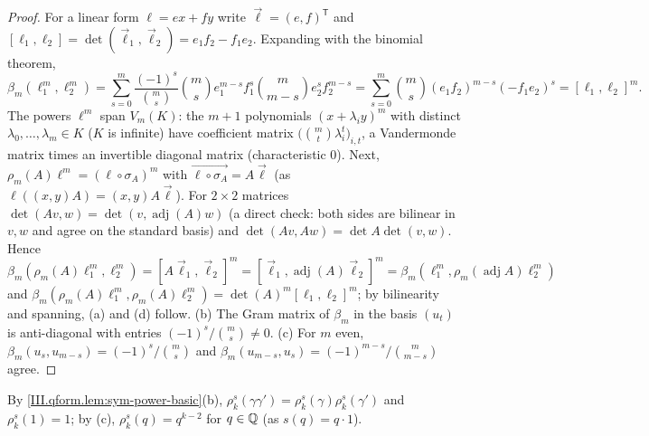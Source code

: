 \begin{lemma}
\end{lemma}
\begin{proof}
For a linear form $\ell=ex+fy$ write $\vec\ell=(e,f)^{\mathsf T}$ and $[\ell_1,\ell_2]=\det(\vec\ell_1,\vec\ell_2)=e_1f_2-f_1e_2$. Expanding with the
binomial theorem,
\[
  \beta_m(\ell_1^m,\ell_2^m)=\sum_{s=0}^m\frac{(-1)^s}{\binom ms}\binom ms e_1^{m-s}f_1^s\binom m{m-s}e_2^{s}f_2^{m-s}
  =\sum_{s=0}^m\binom ms(e_1f_2)^{m-s}(-f_1e_2)^s=[\ell_1,\ell_2]^m.
\]
The powers $\ell^m$ span $V_m(K)$: the $m+1$ polynomials $(x+\lambda_iy)^m$ with distinct $\lambda_0,\dots,\lambda_m\in K$ ($K$ is infinite) have
coefficient matrix $\bigl(\binom mt\lambda_i^t\bigr)_{i,t}$, a Vandermonde matrix times an invertible diagonal matrix (characteristic $0$). Next,
$\rho_m(A)\ell^m=(\ell\circ\sigma_A)^m$ with $\overrightarrow{\ell\circ\sigma_A}=A\vec\ell$ (as $\ell((x,y)A)=(x,y)A\vec\ell$). For $2\times2$ matrices
$\det(Av,w)=\det(v,\operatorname{adj}(A)w)$ (a direct check: both sides are bilinear in $v,w$ and agree on the standard basis) and
$\det(Av,Aw)=\det A\det(v,w)$. Hence
$\beta_m(\rho_m(A)\ell_1^m,\ell_2^m)=[A\vec\ell_1,\vec\ell_2]^m=[\vec\ell_1,\operatorname{adj}(A)\vec\ell_2]^m=\beta_m(\ell_1^m,\rho_m(\operatorname{adj}A)\ell_2^m)$ and
$\beta_m(\rho_m(A)\ell_1^m,\rho_m(A)\ell_2^m)=\det(A)^m[\ell_1,\ell_2]^m$; by bilinearity and spanning, (a) and (d) follow. (b) The Gram matrix of
$\beta_m$ in the basis $(u_t)$ is anti-diagonal with entries $(-1)^s/\binom ms\ne0$. (c) For $m$ even, $\beta_m(u_s,u_{m-s})=(-1)^s/\binom ms$ and
$\beta_m(u_{m-s},u_s)=(-1)^{m-s}/\binom m{m-s}$ agree.
\end{proof}

\begin{definition}[splittings]
\end{definition}

\begin{definition}
\end{definition}
\noindent By \cref{III.qform.lem:sym-power-basic}(b), $\rho_k^s(\gamma\gamma')=\rho_k^s(\gamma)\rho_k^s(\gamma')$ and $\rho_k^s(1)=1$; by (c),
$\rho_k^s(q)=q^{k-2}$ for $q\in\mathbb{Q}$ (as $s(q)=q\cdot1$).


